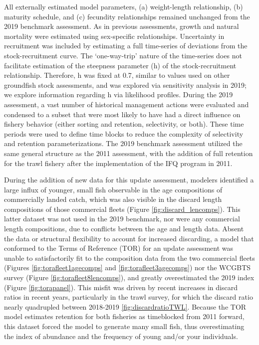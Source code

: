 \documentclass[11pt,
  english,
  a4paper,
]{article}
\begin{document}
All externally estimated model parameters, (a) weight-length relationship, (b) maturity schedule, and (c) fecundity relationships remained unchanged from the 2019 benchmark assessment. As in previous assessments, growth and natural mortality were estimated using sex-specific relationships. Uncertainty in recruitment was included by estimating a full time-series of deviations from the stock-recruitment curve. The `one-way-trip' nature of the time-series does not facilitate estimation of the steepness parameter (h) of the stock-recruitment relationship. Therefore, h was fixed at 0.7, similar to values used on other groundfish stock assessments, and was explored via sensitivity analysis in 2019; we explore information regarding h via likelihood profiles. During the 2019 assessment, a vast number of historical management actions were evaluated and condensed to a subset that were most likely to have had a direct influence on fishery behavior (either sorting and retention, selectivity, or both). These time periods were used to define time blocks to reduce the complexity of selectivity and retention parameterizations. The 2019 benchmark assessment utilized the same general structure as the 2011 assessment, with the addition of full retention for the trawl fishery after the implementation of the IFQ program in 2011.

\leavevmode\tagmcend\tagstructend\par


During the addition of new data for this update assessment, modelers identified a large influx of younger, small fish observable in the age compositions of commercially landed catch, which was also visible in the discard length compositions of those commercial fleets (Figure \ref{fig:discard_lencomps}). This latter dataset was not used in the 2019 benchmark, nor were any commercial length compositions, due to conflicts between the age and length data. Absent the data or structural flexibility to account for increased discarding, a model that conformed to the Terms of Reference (TOR) for an update assessment was unable to satisfactorily fit to the composition data from the two commercial fleets (Figures \ref{fig:torafleet1agecomps} and \ref{fig:torafleet3agecomps}) nor the WCGBTS survey (Figure \ref{fig:torafleet8lencomps}), and greatly overestimated the 2019 index (Figure \ref{fig:torapanel}). This misfit was driven by recent increases in discard ratios in recent years, particularly in the trawl survey, for which the discard ratio nearly quadrupled between 2018-2019 \ref{fig:discardratioTWL}. Because the TOR model estimates retention for both fisheries as timeblocked from 2011 forward, this dataset forced the model to generate many small fish, thus overestimating the index of abundance and the frequency of young and/or your individuals.
\end{document}
